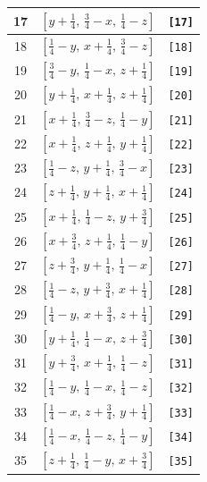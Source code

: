 \documentclass[fleqn,8pt]{jsarticle}
\begin{document}
\begin{longtable}{ccc}
17 & $\left[ y + \frac{1}{4},\, \frac{3}{4} - x,\, \frac{1}{4} - z \right]$ & {\tt [17]} \\ \hline
18 & $\left[ \frac{1}{4} - y,\, x + \frac{1}{4},\, \frac{3}{4} - z \right]$ & {\tt [18]} \\ \hline
19 & $\left[ \frac{3}{4} - y,\, \frac{1}{4} - x,\, z + \frac{1}{4} \right]$ & {\tt [19]} \\ \hline
20 & $\left[ y + \frac{1}{4},\, x + \frac{1}{4},\, z + \frac{1}{4} \right]$ & {\tt [20]} \\ \hline
21 & $\left[ x + \frac{1}{4},\, \frac{3}{4} - z,\, \frac{1}{4} - y \right]$ & {\tt [21]} \\ \hline
22 & $\left[ x + \frac{1}{4},\, z + \frac{1}{4},\, y + \frac{1}{4} \right]$ & {\tt [22]} \\ \hline
23 & $\left[ \frac{1}{4} - z,\, y + \frac{1}{4},\, \frac{3}{4} - x \right]$ & {\tt [23]} \\ \hline
24 & $\left[ z + \frac{1}{4},\, y + \frac{1}{4},\, x + \frac{1}{4} \right]$ & {\tt [24]} \\ \hline
25 & $\left[ x + \frac{1}{4},\, \frac{1}{4} - z,\, y + \frac{3}{4} \right]$ & {\tt [25]} \\ \hline
26 & $\left[ x + \frac{3}{4},\, z + \frac{1}{4},\, \frac{1}{4} - y \right]$ & {\tt [26]} \\ \hline
27 & $\left[ z + \frac{3}{4},\, y + \frac{1}{4},\, \frac{1}{4} - x \right]$ & {\tt [27]} \\ \hline
28 & $\left[ \frac{1}{4} - z,\, y + \frac{3}{4},\, x + \frac{1}{4} \right]$ & {\tt [28]} \\ \hline
29 & $\left[ \frac{1}{4} - y,\, x + \frac{3}{4},\, z + \frac{1}{4} \right]$ & {\tt [29]} \\ \hline
30 & $\left[ y + \frac{1}{4},\, \frac{1}{4} - x,\, z + \frac{3}{4} \right]$ & {\tt [30]} \\ \hline
31 & $\left[ y + \frac{3}{4},\, x + \frac{1}{4},\, \frac{1}{4} - z \right]$ & {\tt [31]} \\ \hline
32 & $\left[ \frac{1}{4} - y,\, \frac{1}{4} - x,\, \frac{1}{4} - z \right]$ & {\tt [32]} \\ \hline
33 & $\left[ \frac{1}{4} - x,\, z + \frac{3}{4},\, y + \frac{1}{4} \right]$ & {\tt [33]} \\ \hline
34 & $\left[ \frac{1}{4} - x,\, \frac{1}{4} - z,\, \frac{1}{4} - y \right]$ & {\tt [34]} \\ \hline
35 & $\left[ z + \frac{1}{4},\, \frac{1}{4} - y,\, x + \frac{3}{4} \right]$ & {\tt [35]} \\ \hline

\end{longtable}
\end{document}
